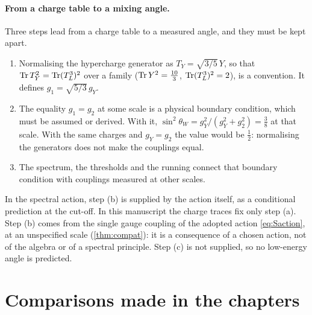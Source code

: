 \paragraph{From a charge table to a mixing angle.} Three steps lead from a charge table to a measured angle, and they must be kept apart.
\begin{enumerate}[label=(\alph*),leftmargin=2.2em]
\item Normalising the hypercharge generator as $T_Y=\sqrt{3/5}\,Y$, so that $\operatorname{Tr} T_Y^2=\operatorname{Tr}(T^3_L)^2$ over a family ($\operatorname{Tr} Y^2=\tfrac{10}3$,
$\operatorname{Tr}(T^3_L)^2=2$), is a convention. It defines $g_1=\sqrt{5/3}\,g_Y$.
\item The equality $g_1=g_2$ at some scale is a physical boundary condition, which must be assumed or derived. With it,
$\sin^2\theta_W=g_Y^2/(g_Y^2+g_2^2)=\tfrac38$ at that scale. With the same charges and $g_Y=g_2$ the value would be $\tfrac12$: normalising the
generators does not make the couplings equal.
\item The spectrum, the thresholds and the running connect that boundary condition with couplings measured at other scales.
\end{enumerate}
In the spectral action, step (b) is supplied by the action itself, as a conditional prediction at the cut-off. In this manuscript the charge
traces fix only step (a). Step (b) comes from the single gauge coupling of the adopted action \eqref{eq:Saction}, at an unspecified scale
(\cref{thm:compat}): it is a consequence of a chosen action, not of the algebra or of a spectral principle. Step (c) is not supplied, so no
low-energy angle is predicted.

\section{Comparisons made in the chapters}
\label{sec:rel:pointers}

